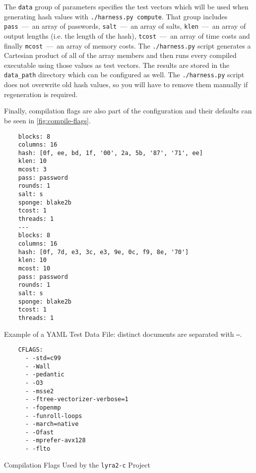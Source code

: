 The \texttt{data} group of parameters specifies the test vectors which will be used when generating hash values with \texttt{./harness.py compute}. That group includes \texttt{pass}~---~an array of passwords, \texttt{salt}~---~an array of salts, \texttt{klen}~---~an array of output lengths (i.e. the length of the hash), \texttt{tcost}~---~an array of time costs and finally \texttt{mcost}~---~an array of memory costs. The \texttt{./harness.py} script generates a Cartesian product of all of the array members and then runs every compiled executable using those values as test vectors. The results are stored in the \texttt{data\_path} directory which can be configured as well. The \texttt{./harness.py} script does not overwrite old hash values, so you will have to remove them manually if regeneration is required.

Finally, compilation flags are also part of the configuration and their defaults can be seen in \autoref{fig:compile-flags}.

\begin{listing}
    \begin{verbatim}
    blocks: 8
    columns: 16
    hash: [0f, ee, bd, 1f, '00', 2a, 5b, '87', '71', ee]
    klen: 10
    mcost: 3
    pass: password
    rounds: 1
    salt: s
    sponge: blake2b
    tcost: 1
    threads: 1
    ---
    blocks: 8
    columns: 16
    hash: [0f, 7d, e3, 3c, e3, 9e, 0c, f9, 8e, '70']
    klen: 10
    mcost: 10
    pass: password
    rounds: 1
    salt: s
    sponge: blake2b
    tcost: 1
    threads: 1
    \end{verbatim}
    \caption{Example of a YAML Test Data File: distinct documents are separated with \texttt{---}.}
    \label{fig:yaml-data}
\end{listing}


\begin{listing}
    \begin{verbatim}
    CFLAGS:
      - -std=c99
      - -Wall
      - -pedantic
      - -O3
      - -msse2
      - -ftree-vectorizer-verbose=1
      - -fopenmp
      - -funroll-loops
      - -march=native
      - -Ofast
      - -mprefer-avx128
      - -flto
      \end{verbatim}
      \caption{Compilation Flags Used by the \texttt{lyra2-c} Project}
      \label{fig:compile-flags}
  \end{listing}
